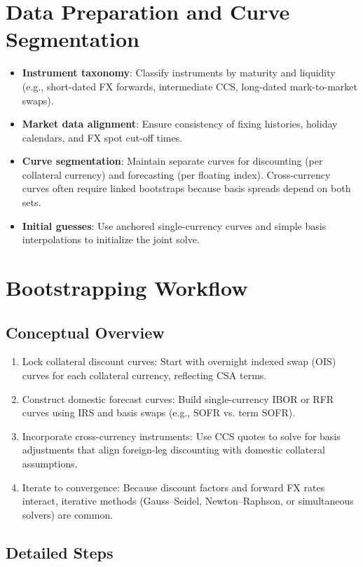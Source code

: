 \documentclass[11pt]{article}
\begin{document}
\section{Data Preparation and Curve Segmentation}
\begin{itemize}[leftmargin=*]
  \item \textbf{Instrument taxonomy}: Classify instruments by maturity and liquidity (e.g., short-dated FX forwards, intermediate CCS, long-dated mark-to-market swaps).
  \item \textbf{Market data alignment}: Ensure consistency of fixing histories, holiday calendars, and FX spot cut-off times.
  \item \textbf{Curve segmentation}: Maintain separate curves for discounting (per collateral currency) and forecasting (per floating index). Cross-currency curves often require linked bootstraps because basis spreads depend on both sets.
  \item \textbf{Initial guesses}: Use anchored single-currency curves and simple basis interpolations to initialize the joint solve.
\end{itemize}

\section{Bootstrapping Workflow}
\subsection{Conceptual Overview}
\begin{enumerate}[leftmargin=*]
  \item Lock collateral discount curves: Start with overnight indexed swap (OIS) curves for each collateral currency, reflecting CSA terms.
  \item Construct domestic forecast curves: Build single-currency IBOR or RFR curves using IRS and basis swaps (e.g., SOFR vs. term SOFR).
  \item Incorporate cross-currency instruments: Use CCS quotes to solve for basis adjustments that align foreign-leg discounting with domestic collateral assumptions.
  \item Iterate to convergence: Because discount factors and forward FX rates interact, iterative methods (Gauss--Seidel, Newton--Raphson, or simultaneous solvers) are common.
\end{enumerate}

\subsection{Detailed Steps}
\end{document}
